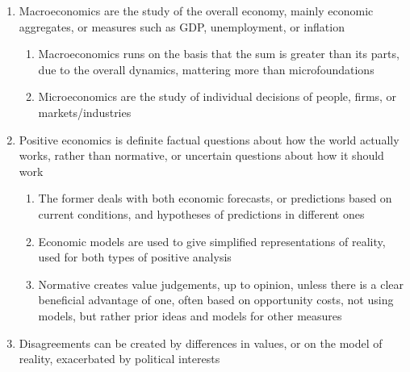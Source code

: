 \documentclass[11 pt, twoside]{article}
\begin{document}
\begin{enumerate}
\item Macroeconomics are the study of the overall economy, mainly economic aggregates, or measures such as GDP,
unemployment, or inflation
\begin{enumerate}
\item Macroeconomics runs on the basis that the sum is greater than its parts, due to the overall dynamics, mattering
more than microfoundations
\item Microeconomics are the study of individual decisions of people, firms, or markets/industries
\end{enumerate}
\item Positive economics is definite factual questions about how the world actually works, rather than normative, or
uncertain questions about how it should work
\begin{enumerate}
\item The former deals with both economic forecasts, or predictions based on current conditions, and hypotheses of
predictions in different ones
\item Economic models are used to give simplified representations of reality, used for both types of positive analysis
\item Normative creates value judgements, up to opinion, unless there is a clear beneficial advantage of one, often
based on opportunity costs, not using models, but rather prior ideas and models for other measures
\end{enumerate}
\item Disagreements can be created by differences in values, or on the model of reality, exacerbated by political
interests
\end{enumerate}
\end{document}
